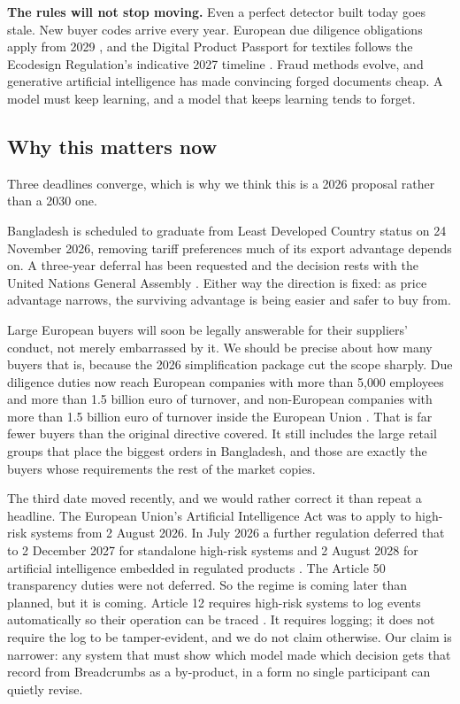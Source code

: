 \documentclass[11pt,a4paper]{article}
\begin{document}
\textbf{The rules will not stop moving.} Even a perfect detector built today
goes stale. New buyer codes arrive every year. European due diligence
obligations apply from 2029 \citep{eu2024csddd,ec2026csddd}, and the Digital
Product Passport for textiles follows the Ecodesign Regulation's indicative 2027
timeline \citep{eu2024espr}. Fraud methods evolve, and generative artificial
intelligence has made convincing forged documents cheap. A model must keep
learning, and a model that keeps learning tends to forget.

\subsection{Why this matters now}

Three deadlines converge, which is why we think this is a 2026 proposal rather
than a 2030 one.

Bangladesh is scheduled to graduate from Least Developed Country status on
24 November 2026, removing tariff preferences much of its export advantage
depends on. A three-year deferral has been requested and the decision rests with
the United Nations General Assembly \citep{un2026ldc}. Either way the direction
is fixed: as price advantage narrows, the surviving advantage is being easier
and safer to buy from.

Large European buyers will soon be legally answerable for their suppliers'
conduct, not merely embarrassed by it. We should be precise about how many
buyers that is, because the 2026 simplification package cut the scope sharply.
Due diligence duties now reach European companies with more than 5{,}000
employees and more than 1.5 billion euro of turnover, and non-European companies
with more than 1.5 billion euro of turnover inside the European Union
\citep{ec2026csddd}. That is far fewer buyers than the original directive
covered. It still includes the large retail groups that place the biggest orders
in Bangladesh, and those are exactly the buyers whose requirements the rest of
the market copies.

The third date moved recently, and we would rather correct it than repeat a
headline. The European Union's Artificial Intelligence Act was to apply to
high-risk systems from 2 August 2026. In July 2026 a further regulation deferred
that to 2 December 2027 for standalone high-risk systems and 2 August 2028 for
artificial intelligence embedded in regulated products \citep{eu2026aiomnibus}.
The Article 50 transparency duties were not deferred. So the regime is coming
later than planned, but it is coming. Article 12 requires high-risk systems to
log events automatically so their operation can be traced \citep{eu2024aiact}.
It requires logging; it does not require the log to be tamper-evident, and we do
not claim otherwise. Our claim is narrower: any system that must show which
model made which decision gets that record from Breadcrumbs as a by-product, in
a form no single participant can quietly revise.
\end{document}
